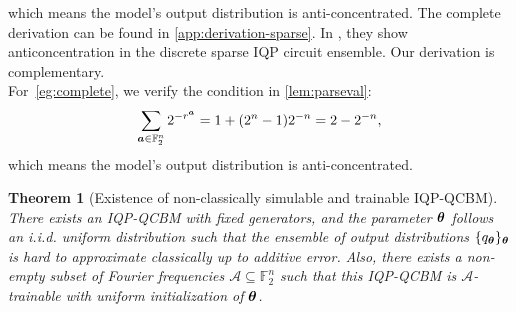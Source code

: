 \documentclass[10pt, twocolumn, a4paper]{article}
\theoremstyle{plain}
\newtheorem{theorem}{Theorem}[section]
\theoremstyle{definition}
\theoremstyle{remark}
\begin{document}
which means the model's output distribution is anti-concentrated. The complete derivation can be found in \cref{app:derivation-sparse}. In \cite{Bremner17}, they show anticoncentration in the discrete sparse IQP circuit ensemble. Our derivation is complementary. 
\\
For~\cref{eg:complete}, we verify the condition in \cref{lem:parseval}: \begin{equation}
\sum_{{\bm{a}} \in \mathbb{F}_2^n} 2^{-r^{\bm{a}}}
= 1+(2^n-1)2^{-n} = 2 - 2^{-n},
\end{equation}
which means the model's output distribution is anti-concentrated. 

\begin{theorem}[Existence of non-classically simulable and trainable IQP-QCBM]
\label{thm:ac_and_pst_exist}
There exists an IQP-QCBM with fixed generators, and the parameter ${\bm{\theta}}$ follows an i.i.d. uniform distribution such that the ensemble of output distributions $\{q_{\bm{\theta}}\}_{\bm{\theta}}$ is hard to approximate classically up to additive error. Also, there exists a non-empty subset of Fourier frequencies $\mathcal{A} \subseteq \mathbb{F}_2^n$ such that this IQP-QCBM is $\mathcal{A}$-trainable with uniform initialization of ${\bm{\theta}}$.
\end{theorem}
\end{document}
